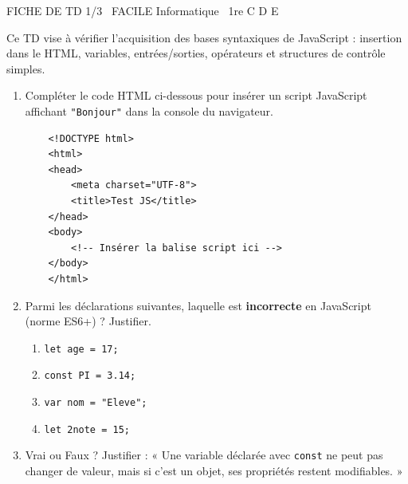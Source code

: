 \documentclass[11pt]{article}
\begin{document}
\begin{tcolorbox}[enhanced,colback=popink,colframe=popink,arc=10pt,boxrule=0pt,left=12pt,right=12pt,top=9pt,bottom=9pt]
{\color{white}\popxbold\small FICHE DE TD 1/3 \textbullet\ FACILE \hfill Informatique \textbullet\ 1re C D E\par}
\end{tcolorbox}
\vspace{4pt}
Ce TD vise à vérifier l'acquisition des bases syntaxiques de JavaScript : insertion dans le HTML, variables, entrées/sorties, opérateurs et structures de contrôle simples.

\begin{exercice}
\begin{enumerate}
    \item Compléter le code HTML ci-dessous pour insérer un script JavaScript affichant \texttt{"Bonjour"} dans la console du navigateur.
    \begin{verbatim}
    <!DOCTYPE html>
    <html>
    <head>
        <meta charset="UTF-8">
        <title>Test JS</title>
    </head>
    <body>
        <!-- Insérer la balise script ici -->
    </body>
    </html>
    \end{verbatim}
    \item Parmi les déclarations suivantes, laquelle est \textbf{incorrecte} en JavaScript (norme ES6+) ? Justifier.
    \begin{enumerate}
        \item \texttt{let age = 17;}
        \item \texttt{const PI = 3.14;}
        \item \texttt{var nom = "Eleve";}
        \item \texttt{let 2note = 15;}
    \end{enumerate}
    \item Vrai ou Faux ? Justifier : « Une variable déclarée avec \texttt{const} ne peut pas changer de valeur, mais si c'est un objet, ses propriétés restent modifiables. »
\end{enumerate}
\end{exercice}
\end{document}
